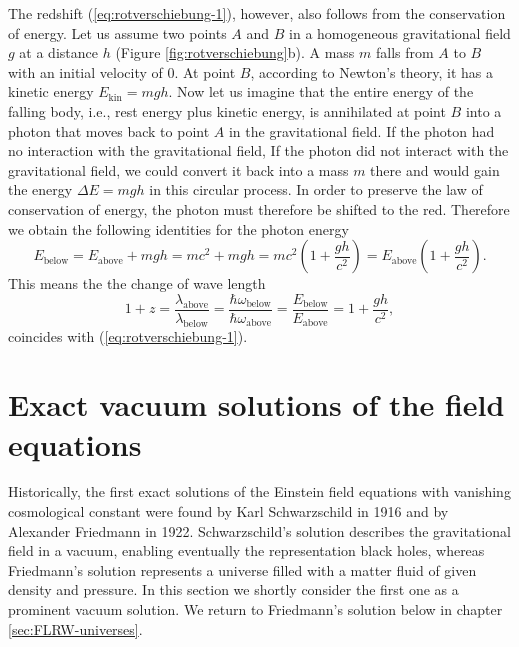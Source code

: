 The redshift (\ref{eq:rotverschiebung-1}), however, also follows from the conservation of energy. Let us assume two points $A$ and $B$ in a homogeneous
gravitational field $g$ at a distance $h$ (Figure \ref{fig:rotverschiebung}b).
A mass $m$ falls from $A$ to $B$ with an initial velocity of 0.
At point $B$, according to Newton's theory, it has a kinetic energy
$E_{\mathrm{kin}} = mgh$. Now let us imagine that the entire energy
of the falling body, i.e., rest energy plus kinetic energy, is annihilated at point $B$
into a photon that moves back to point $A$ in the gravitational field.
If the photon had no interaction with the gravitational field, If the photon did not interact with the gravitational field,
we could convert it back into a mass $m$ there and would gain the energy $\Delta E = mgh$ in
this circular process.
In order to preserve the law of conservation of energy, the photon must therefore be shifted to the red. Therefore we obtain the following identities for the photon energy
$$
	E_{\mathrm{below}}
	= E_{\mathrm{above}} + mgh
	= mc^2 + mgh
	= mc^2 \left( 1 + \frac{gh}{c^2}\right)
	= E_{\mathrm{above}} \left( 1 + \frac{gh}{c^2}\right)
	.
$$
This means the the change of wave length
\begin{equation}
	1+z 
	= \frac{\lambda_{\mathrm{above}}}{\lambda_{\mathrm{below}}}
	= \frac{\hbar \omega_{\mathrm{below}}}{\hbar \omega_{\mathrm{above}}}
	= \frac{E_{\mathrm{below}}}{E_{\mathrm{above}}}
	= 1 + \frac{gh}{c^2}
	,
\end{equation}
coincides with (\ref{eq:rotverschiebung-1}).


\section{Exact vacuum solutions of the field equations}

Historically, the first exact solutions of the Einstein field equations with vanishing cosmological constant were found by Karl Schwarzschild in 1916 and by Alexander Friedmann in 1922. Schwarzschild's solution describes the gravitational field in a vacuum, enabling eventually the representation black holes, whereas Friedmann's solution represents a universe filled with a matter fluid of given density and pressure.
In this section we shortly consider the first one as a prominent vacuum solution. We return to Friedmann's solution below in chapter \ref{sec:FLRW-universes}.




